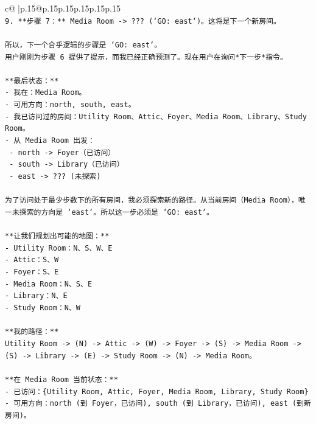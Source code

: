 \documentclass{article}
\begin{document}
{\begin{supertabular}{c@{$\;$}|p{.15\linewidth}@{}p{.15\linewidth}p{.15\linewidth}p{.15\linewidth}p{.15\linewidth}p{.15\linewidth}}
{{{\\ 
\texttt{9.  **步骤 7：** Media Room {-}> ??? (`GO: east`)。这将是下一个新房间。} \\
\\ 
\texttt{所以，下一个合乎逻辑的步骤是 `GO: east`。} \\
\texttt{用户刚刚为步骤 6 提供了提示，而我已经正确预测了。现在用户在询问*下一步*指令。} \\
\\ 
\texttt{**最后状态：**} \\
\texttt{{-} 我在：Media Room。} \\
\texttt{{-} 可用方向：north, south, east。} \\
\texttt{{-} 我已访问过的房间：Utility Room、Attic、Foyer、Media Room、Library、Study Room。} \\
\texttt{{-} 从 Media Room 出发：} \\
\texttt{    {-} north {-}> Foyer（已访问）} \\
\texttt{    {-} south {-}> Library（已访问）} \\
\texttt{    {-} east {-}> ??? (未探索)} \\
\\ 
\texttt{为了访问处于最少步数下的所有房间，我必须探索新的路径。从当前房间（Media Room），唯一未探索的方向是 `east`。所以这一步必须是 `GO: east`。} \\
\\ 
\texttt{**让我们规划出可能的地图：**} \\
\texttt{{-} Utility Room：N、S、W、E} \\
\texttt{{-} Attic：S、W} \\
\texttt{{-} Foyer：S、E} \\
\texttt{{-} Media Room：N、S、E} \\
\texttt{{-} Library：N、E} \\
\texttt{{-} Study Room：N、W} \\
\\ 
\texttt{**我的路径：**} \\
\texttt{Utility Room {-}> (N) {-}> Attic {-}> (W) {-}> Foyer {-}> (S) {-}> Media Room {-}> (S) {-}> Library {-}> (E) {-}> Study Room {-}> (N) {-}> Media Room。} \\
\\ 
\texttt{**在 Media Room 当前状态：**} \\
\texttt{{-} 已访问：\{Utility Room, Attic, Foyer, Media Room, Library, Study Room\}} \\
\texttt{{-} 可用方向：north (到 Foyer，已访问), south (到 Library，已访问), east (到新房间)。} \\
}}}
\end{supertabular}}
\end{document}
